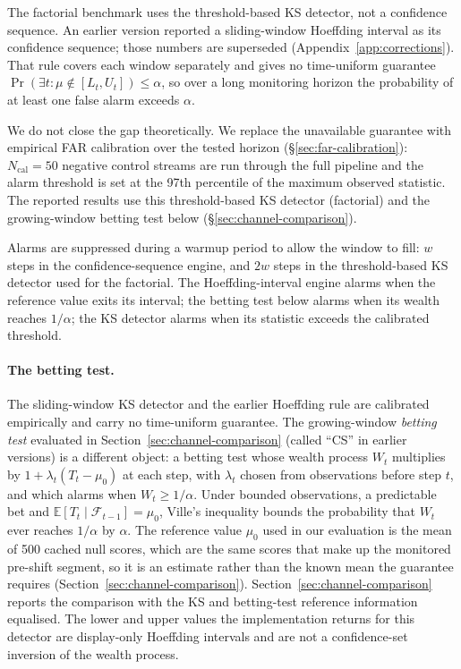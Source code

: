 \documentclass{article}
\begin{document}
The factorial benchmark uses the threshold-based KS detector, not a confidence sequence. An earlier version reported a sliding-window Hoeffding interval as its confidence sequence; those numbers are superseded (Appendix~\ref{app:corrections}). That rule covers each window separately and gives no time-uniform guarantee $\Pr(\exists t: \mu \notin [L_t, U_t]) \leq \alpha$, so over a long monitoring horizon the probability of at least one false alarm exceeds $\alpha$.

We do not close the gap theoretically. We replace the unavailable guarantee with empirical FAR calibration over the tested horizon (\S\ref{sec:far-calibration}): $N_{\text{cal}} = 50$ negative control streams are run through the full pipeline and the alarm threshold is set at the 97th percentile of the maximum observed statistic. The reported results use this threshold-based KS detector (factorial) and the growing-window betting test below (\S\ref{sec:channel-comparison}).

Alarms are suppressed during a warmup period to allow the window to fill: $w$ steps in the confidence-sequence engine, and $2w$ steps in the threshold-based KS detector used for the factorial. The Hoeffding-interval engine alarms when the reference value exits its interval; the betting test below alarms when its wealth reaches $1/\alpha$; the KS detector alarms when its statistic exceeds the calibrated threshold.

\paragraph{The betting test.} The sliding-window KS detector and the earlier Hoeffding rule are calibrated empirically and carry no time-uniform guarantee. The growing-window \emph{betting test} evaluated in Section~\ref{sec:channel-comparison} (called ``CS'' in earlier versions) is a different object: a betting test whose wealth process $W_t$ multiplies by $1+\lambda_t(T_t-\mu_0)$ at each step, with $\lambda_t$ chosen from observations before step $t$, and which alarms when $W_t\geq 1/\alpha$. Under bounded observations, a predictable bet and $\mathbb{E}[T_t\mid\mathcal{F}_{t-1}]=\mu_0$, Ville's inequality bounds the probability that $W_t$ ever reaches $1/\alpha$ by $\alpha$. The reference value $\mu_0$ used in our evaluation is the mean of 500 cached null scores, which are the same scores that make up the monitored pre-shift segment, so it is an estimate rather than the known mean the guarantee requires (Section~\ref{sec:channel-comparison}). Section~\ref{sec:channel-comparison} reports the comparison with the KS and betting-test reference information equalised. The lower and upper values the implementation returns for this detector are display-only Hoeffding intervals and are not a confidence-set inversion of the wealth process.
\end{document}
